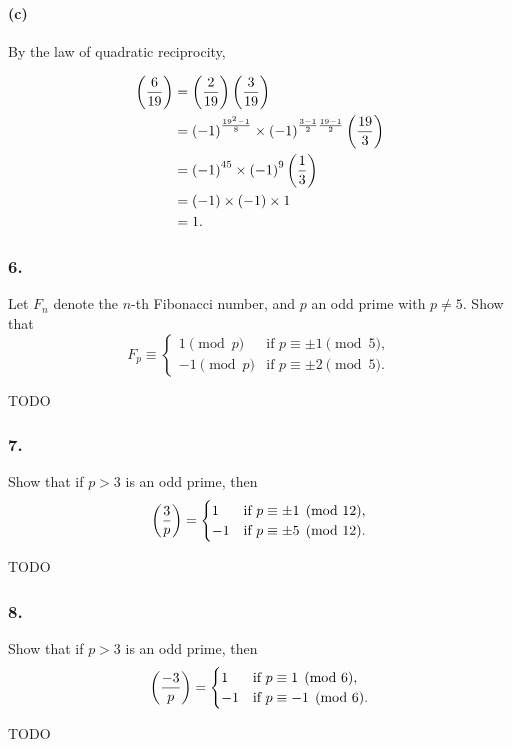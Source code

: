 \paragraph{(c)} By the law of quadratic reciprocity,

\begin{align*}
    \left(\frac{6}{19}\right) &= \left(\frac{2}{19}\right)\left(\frac{3}{19}\right) \\
    &= \left(-1\right)^{\frac{19^2-1}{8}} \times \left(-1\right)^{\frac{3-1}{2}\frac{19-1}{2}}\left(\frac{19}{3}\right) \\
    &= \left(-1\right)^{45} \times \left( -1 \right)^{9} \left(\frac{1}{3}\right) \\
    &= \left(-1\right) \times \left(-1\right) \times 1 \\
    &= 1.
\end{align*}

\subsubsection{6.} Let $F_n$ denote the $n$-th Fibonacci number,
and $p$ an odd prime with $p \neq 5$. Show that
\[
    F_p \equiv \begin{cases}
        1 \pmod{p} & \mbox{if } p \equiv \pm 1 \pmod{5},\\
        -1 \pmod{p} & \mbox{if } p \equiv \pm 2 \pmod{5}.
    \end{cases}
\]

{\Large TODO}

\subsubsection{7.} Show that if $p>3$ is an odd prime, then
\[
    \left(\frac{3}{p}\right) = \begin{cases}
        1 & \mbox{if } p \equiv \pm 1 \pmod{12}, \\
        -1 & \mbox{if }p \equiv \pm 5 \pmod{12}.
    \end{cases}
\]

{\Large TODO}

\subsubsection{8.} Show that if $p>3$ is an odd prime, then
\[
    \left(\frac{-3}{p}\right) = \begin{cases}
        1 & \mbox{if } p \equiv 1 \pmod{6}, \\
        -1 & \mbox{if }p \equiv -1 \pmod{6}.
    \end{cases}
\]

{\Large TODO}


